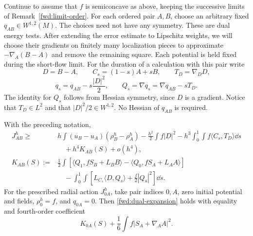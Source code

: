 Continue to assume that \(f\) is semiconcave as above, keeping the
successive limits of Remark~\ref{fwd:limit-order}. For each
ordered pair \(A,B\), choose an arbitrary fixed
\(q_{AB}\in W^{1,2}(M)\). The choices need not have any symmetry.
These are dual energy tests. After extending the error estimate to
Lipschitz weights, we will choose their gradients on finitely many
localization pieces to approximate \(-\nabla_A(B-A)\) and remove
the remaining square. Each potential is held fixed during the
short-flow limit.
For the duration of a calculation with this pair write
\[
 D=B-A,\qquad C_s=(1-s)A+sB,\qquad T_D=\nabla_DD,
\]
\[
 q_s=q_{AB}-s\frac{|D|^2}{2},\qquad
 Q_s=\nabla q_s=\nabla q_{AB}-sT_D.
\]
The identity for \(Q_s\) follows from Hessian symmetry, since
\(D\) is a gradient. Notice that \(T_D\in L^2\) and that
\(|D|^2/2\in W^{1,2}\). No Hessian of \(q_{AB}\) is required.

\begin{lemma}
\label{fwd:dual}
With the preceding notation,
\begin{align}
 J^h_{AB}\geq{}&
 h\int(u_B-u_A)(\rho^h_B-\rho^h_A)
 -\frac{h^2}{2}\int f|D|^2
 -h^3\int_0^1\int f\langle C_s,T_D\rangle\dd s
 \nonumber\\
 &\quad+h^4K_{AB}(S)+o(h^4),
 \label{fwd:dual-expansion}\\
 K_{AB}(S):={}&
 \frac12\int\left[
  \langle Q_1,fS_B+L_BB\rangle
  -\langle Q_0,fS_A+L_AA\rangle\right]
 \nonumber\\
 &\quad-\int_0^1\int
     \left[L_{C_s}\langle D,Q_s\rangle+\frac f2|Q_s|^2\right]\dd s.
 \label{fwd:dual-coefficient}
\end{align}
For the prescribed radial action \(J^h_{0A}\), take pair indices
\(0,A\), zero initial potential and fields, \(\rho^h_0=f\), and
\(q_{0A}=0\). Then \eqref{fwd:dual-expansion} holds with equality
and fourth-order coefficient
\begin{equation}
\label{fwd:radial-defect}
 K_{0A}(S)+\frac16\int f|S_A+\nabla_AA|^2.
\end{equation}
\end{lemma}

